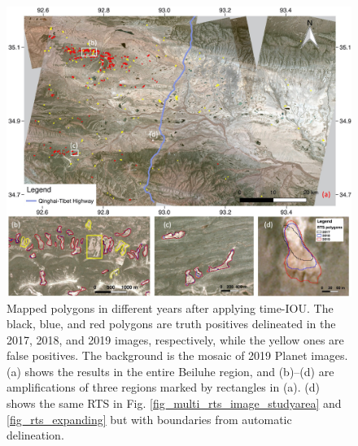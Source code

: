 \documentclass[authoryear,preprint,review,12pt]{elsarticle}
\begin{document}



\begin{figure} 
	\centering
	\includegraphics[width=14cm]{figs/multi_mapping_results_trim.jpg}
	\caption{Mapped polygons in different years after applying time-IOU. The black, blue, and red polygons are truth positives delineated in the 2017, 2018, and 2019 images, respectively, while the yellow ones are false  positives. The background is the mosaic of 2019 Planet images. (a) shows the results in the entire Beiluhe region, and (b)--(d) are amplifications of three regions marked by rectangles in (a). (d) shows the same RTS in Fig. \ref{fig_multi_rts_image_studyarea} and \ref{fig_rts_expanding} but with boundaries from automatic delineation.}
	\label{fig_mapping_results}
\end{figure}
\end{document}

